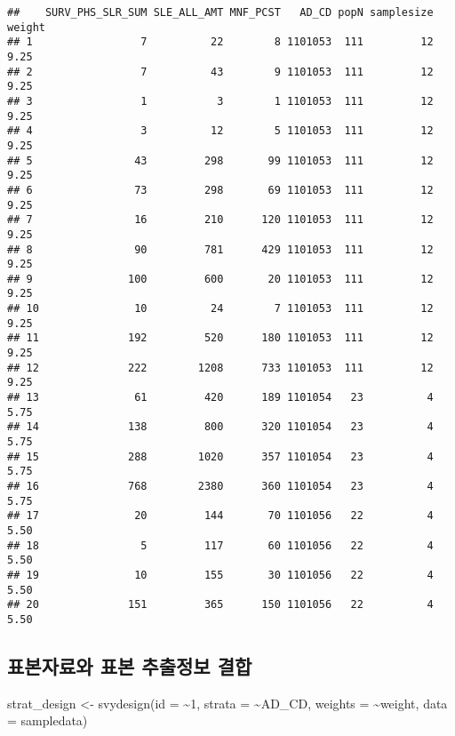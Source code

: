 \documentclass[
]{book}
\newenvironment{Shaded}{\begin{snugshade}}{\end{snugshade}}
\newcommand{\AttributeTok}[1]{\textcolor[rgb]{0.77,0.63,0.00}{#1}}
\newcommand{\DecValTok}[1]{\textcolor[rgb]{0.00,0.00,0.81}{#1}}
\newcommand{\FunctionTok}[1]{\textcolor[rgb]{0.00,0.00,0.00}{#1}}
\newcommand{\NormalTok}[1]{#1}
\newcommand{\OtherTok}[1]{\textcolor[rgb]{0.56,0.35,0.01}{#1}}
\newcommand{\SpecialCharTok}[1]{\textcolor[rgb]{0.00,0.00,0.00}{#1}}
\begin{document}
\begin{verbatim}
##    SURV_PHS_SLR_SUM SLE_ALL_AMT MNF_PCST   AD_CD popN samplesize weight
## 1                 7          22        8 1101053  111         12   9.25
## 2                 7          43        9 1101053  111         12   9.25
## 3                 1           3        1 1101053  111         12   9.25
## 4                 3          12        5 1101053  111         12   9.25
## 5                43         298       99 1101053  111         12   9.25
## 6                73         298       69 1101053  111         12   9.25
## 7                16         210      120 1101053  111         12   9.25
## 8                90         781      429 1101053  111         12   9.25
## 9               100         600       20 1101053  111         12   9.25
## 10               10          24        7 1101053  111         12   9.25
## 11              192         520      180 1101053  111         12   9.25
## 12              222        1208      733 1101053  111         12   9.25
## 13               61         420      189 1101054   23          4   5.75
## 14              138         800      320 1101054   23          4   5.75
## 15              288        1020      357 1101054   23          4   5.75
## 16              768        2380      360 1101054   23          4   5.75
## 17               20         144       70 1101056   22          4   5.50
## 18                5         117       60 1101056   22          4   5.50
## 19               10         155       30 1101056   22          4   5.50
## 20              151         365      150 1101056   22          4   5.50
\end{verbatim}

\hypertarget{uxd45cuxbcf8uxc790uxb8ccuxc640-uxd45cuxbcf8-uxcd94uxcd9cuxc815uxbcf4-uxacb0uxd569}{%
\subsection{표본자료와 표본 추출정보 결합}\label{uxd45cuxbcf8uxc790uxb8ccuxc640-uxd45cuxbcf8-uxcd94uxcd9cuxc815uxbcf4-uxacb0uxd569}}

\begin{Shaded}
\begin{Highlighting}[]
\NormalTok{strat\_design }\OtherTok{\textless{}{-}} \FunctionTok{svydesign}\NormalTok{(}\AttributeTok{id =} \SpecialCharTok{\textasciitilde{}}\DecValTok{1}\NormalTok{, }\AttributeTok{strata =} \SpecialCharTok{\textasciitilde{}}\NormalTok{AD\_CD, }\AttributeTok{weights =} \SpecialCharTok{\textasciitilde{}}\NormalTok{weight, }\AttributeTok{data =}\NormalTok{ sampledata)}
\end{Highlighting}
\end{Shaded}
\end{document}
